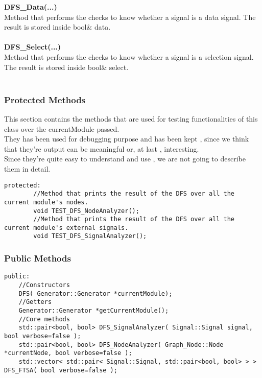 \documentclass{article}
\begin{document}
\textbf{DFS\_Data(...)}\\
Method that performs the checks to know whether a signal is a data signal. The result is stored inside bool\& data.\\\\

\textbf{DFS\_Select(...)}\\
Method that performs the checks to know whether a signal is a selection signal. The result is stored inside bool\& select.\\\\

\subsubsection{Protected Methods}

This section contains the methods that are used for testing functionalities of this class over the currentModule passed.\\
They has been used for debugging purpose and has been kept , since we think that they're output can be meaningful or, at last , interesting.\\
Since they're quite easy to understand and use , we are not going to describe them in detail.\\

\begin{mdframed}[hidealllines=true, backgroundcolor=magenta!10]
	\begin{lstlisting}[basicstyle=\tiny]
	protected:
		//Method that prints the result of the DFS over all the current module's nodes.
		void TEST_DFS_NodeAnalyzer();
		//Method that prints the result of the DFS over all the current module's external signals.
		void TEST_DFS_SignalAnalyzer();
	\end{lstlisting}
\end{mdframed}

\subsubsection{Public Methods}

\begin{mdframed}[hidealllines=true, backgroundcolor=magenta!10]
	\begin{lstlisting}[basicstyle=\tiny]
	public:
	//Constructors
	DFS( Generator::Generator *currentModule);
	//Getters
	Generator::Generator *getCurrentModule();
	//Core methods
	std::pair<bool, bool> DFS_SignalAnalyzer( Signal::Signal signal, bool verbose=false );
	std::pair<bool, bool> DFS_NodeAnalyzer( Graph_Node::Node *currentNode, bool verbose=false );
	std::vector< std::pair< Signal::Signal, std::pair<bool, bool> > > DFS_FTSA( bool verbose=false );
	\end{lstlisting}
\end{mdframed}
\end{document}
